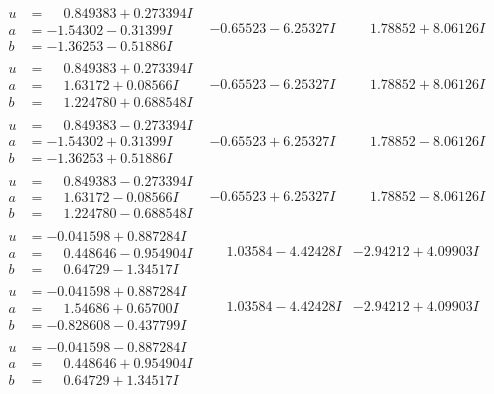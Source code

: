 \documentclass[1p]{elsarticle_modified}
\theoremstyle{definition}
\begin{document}
$$\begin{array}{c|c|c}
\begin{aligned}
u &= \phantom{-}0.849383 + 0.273394 I \\
a &= -1.54302 - 0.31399 I \\
b &= -1.36253 - 0.51886 I\end{aligned}
 & -0.65523 - 6.25327 I & \phantom{-}1.78852 + 8.06126 I \\ \hline\begin{aligned}
u &= \phantom{-}0.849383 + 0.273394 I \\
a &= \phantom{-}1.63172 + 0.08566 I \\
b &= \phantom{-}1.224780 + 0.688548 I\end{aligned}
 & -0.65523 - 6.25327 I & \phantom{-}1.78852 + 8.06126 I \\ \hline\begin{aligned}
u &= \phantom{-}0.849383 - 0.273394 I \\
a &= -1.54302 + 0.31399 I \\
b &= -1.36253 + 0.51886 I\end{aligned}
 & -0.65523 + 6.25327 I & \phantom{-}1.78852 - 8.06126 I \\ \hline\begin{aligned}
u &= \phantom{-}0.849383 - 0.273394 I \\
a &= \phantom{-}1.63172 - 0.08566 I \\
b &= \phantom{-}1.224780 - 0.688548 I\end{aligned}
 & -0.65523 + 6.25327 I & \phantom{-}1.78852 - 8.06126 I \\ \hline\begin{aligned}
u &= -0.041598 + 0.887284 I \\
a &= \phantom{-}0.448646 - 0.954904 I \\
b &= \phantom{-}0.64729 - 1.34517 I\end{aligned}
 & \phantom{-}1.03584 - 4.42428 I & -2.94212 + 4.09903 I \\ \hline\begin{aligned}
u &= -0.041598 + 0.887284 I \\
a &= \phantom{-}1.54686 + 0.65700 I \\
b &= -0.828608 - 0.437799 I\end{aligned}
 & \phantom{-}1.03584 - 4.42428 I & -2.94212 + 4.09903 I \\ \hline\begin{aligned}
u &= -0.041598 - 0.887284 I \\
a &= \phantom{-}0.448646 + 0.954904 I \\
b &= \phantom{-}0.64729 + 1.34517 I\end{aligned}

\end{array}$$
\end{document}
